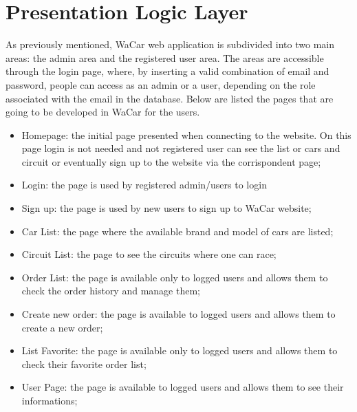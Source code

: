 \section{Presentation Logic Layer}


As previously mentioned, WaCar web application is subdivided into two main areas: the admin area and the registered user area. The areas are accessible through the login page, where, by inserting a valid combination of email and password, people can access as an admin or a user, depending on the role associated with the email in the database. Below are listed the pages that are going to be developed in WaCar for the users.
\begin{itemize}
    \item Homepage: the initial page presented when connecting to the website. On this page login is not needed and not registered user can see the list or cars and circuit or eventually sign up to the website via the corrispondent page;
    \item Login: the page is used by registered admin/users to login
    \item Sign up: the page is used by new users to sign up to WaCar website;
    \item Car List: the page where the available brand and model of cars are listed;
    \item Circuit List: the page to see the circuits where one can race;
    \item Order List: the page is available only to logged users and allows them to check the order history and manage them;
    \item Create new order: the page is available to logged users and allows them to create a new order;
    \item List Favorite: the page is available only to logged users and allows them to check their favorite order list;
    \item User Page: the page is available to logged users and allows them to see their informations;\\
\end{itemize}

